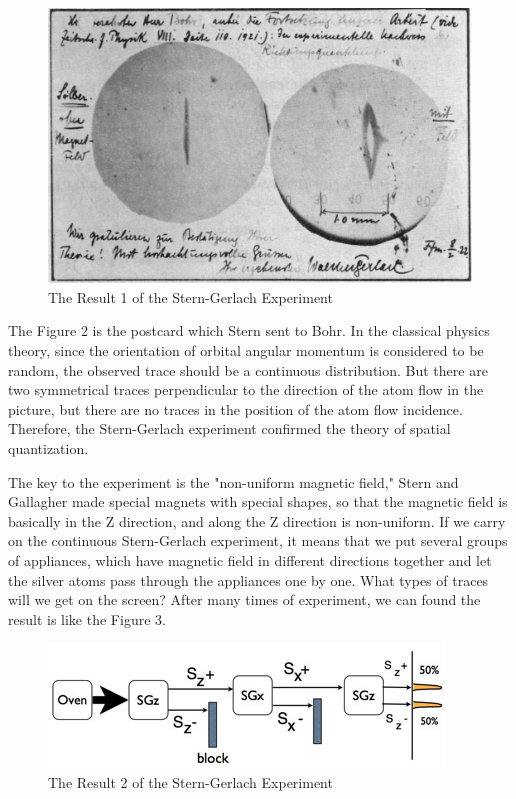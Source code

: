 \documentclass[a4paper]{article}
\begin{document}
\begin{figure}[htbp!] \label{1st result}
\centering %
    \includegraphics[width=0.8\linewidth]{1st.jpg}
    \caption{The Result 1 of the Stern-Gerlach Experiment}
\end{figure}

The Figure 2 is the postcard which Stern sent to Bohr. In the classical physics theory, since the orientation of orbital angular momentum is considered to be random, the observed trace should be a continuous distribution. But there are two symmetrical traces perpendicular to the direction of the atom flow in the picture, but there are no traces in the position of the atom flow incidence. Therefore, the Stern-Gerlach experiment confirmed the theory of spatial quantization.
\cite{FeynmanR.P.Leighton2005}

The key to the experiment is the "non-uniform magnetic field," Stern and Gallagher made special magnets with special shapes, so that the magnetic field is basically in the Z direction, and along the Z direction is non-uniform. If we carry on the continuous Stern-Gerlach experiment, it means that we put several groups of appliances, which have magnetic field in different directions together and let the silver atoms pass through the appliances one by one. What types of traces will we get on the screen? After many times of experiment, we can found the result is like the Figure 3.

\begin{figure}[htbp!] \label{2nd result}
\centering %
    \includegraphics[width=0.8\linewidth]{2nd.jpg}
    \caption{The Result 2 of the Stern-Gerlach Experiment}
\end{figure}
\end{document}
